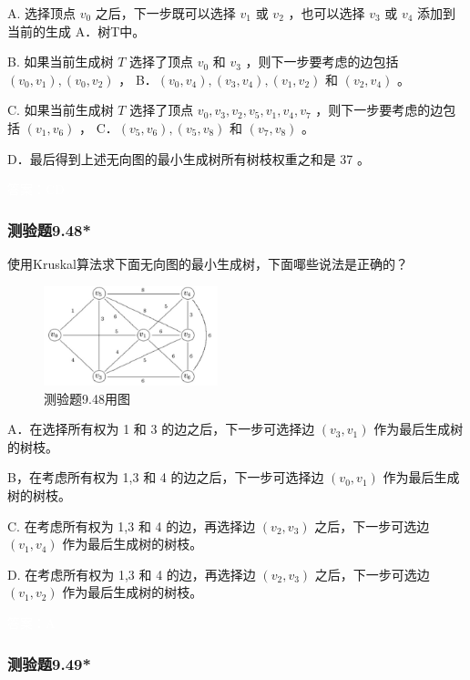 \documentclass[UTF8, heading=true]{ctexart}
\begin{document}
A. 选择顶点 $v_0$ 之后，下一步既可以选择 $v_1$ 或 $v_2$ ，也可以选择 $v_3$ 或 $v_4$ 添加到当前的生成 A．树T中。

B. 如果当前生成树 $T$ 选择了顶点 $v_0$ 和 $v_3$ ，则下一步要考虑的边包括 $\left(v_0, v_1\right),\left(v_0, v_2\right)$ ， B．$\left(v_0, v_4\right),\left(v_3, v_4\right),\left(v_1, v_2\right)$ 和 $\left(v_2, v_4\right)$ 。

C. 如果当前生成树 $T$ 选择了顶点 $v_0, v_3, v_2, v_5, v_1, v_4, v_7$ ，则下一步要考虑的边包括 $\left(v_1, v_6\right)$ ， C．$\left(v_5, v_6\right),\left(v_5, v_8\right)$ 和 $\left(v_7, v_8\right)$ 。

D．最后得到上述无向图的最小生成树所有树枝权重之和是 37 。

\textcolor{white}{答案：CD}

\subsubsection{测验题9.48*}

使用Kruskal算法求下面无向图的最小生成树，下面㖿些说法是正确的？

\begin{figure}[H]
  \centering
  \includegraphics[width=0.45\textwidth]{9.48.jpg} %
  \caption{测验题9.48用图}
\end{figure}

A．在选择所有权为 1 和 3 的边之后，下一步可选择边 $\left(v_3, v_1\right)$ 作为最后生成树的树枝。

B，在考虑所有权为 1,3 和 4 的边之后，下一步可选择边 $\left(v_0, v_1\right)$ 作为最后生成树的树枝。

C. 在考虑所有权为 1,3 和 4 的边，再选择边 $\left(v_2, v_3\right)$ 之后，下一步可选边 $\left(v_1, v_4\right)$ 作为最后生成树的树枝。

D. 在考虑所有权为 1,3 和 4 的边，再选择边 $\left(v_2, v_3\right)$ 之后，下一步可选边 $\left(v_1, v_2\right)$ 作为最后生成树的树枝。

\textcolor{white}{答案：A}

\subsubsection{测验题9.49*}
\end{document}
